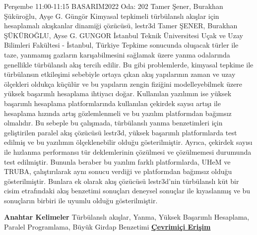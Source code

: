 
    \begin{abstract_basarim}
    {Perşembe 11:00-11:15}
    {BASARIM2022}
    {Oda: 202}
    {Tamer Şener, Burakhan Şüküroğlu, Ayşe G. Güngör}
    {Kimyasal tepkimeli türbülanslı akışlar için hesaplamalı akışkanlar dinamiği çözücüsü, lestr3d}
    {%
    Tamer ŞENER, Burakhan ŞÜKÜROĞLU, Ayse G. GUNGOR}
    {%
    }
    {%
    İstanbul Teknik Üniversitesi Uçak ve Uzay Bilimleri Fakültesi - İstanbul, Türkiye}
    Tepkime sonucunda oluşacak türler ile taze, yanmamış gazların karışabilmesini sağlamak üzere yanma odalarında genellikle türbülanslı akış tercih edilir. Bu gibi problemlerde, kimyasal tepkime ile türbülansın etkileşimi sebebiyle ortaya çıkan akış yapılarının zaman ve uzay ölçekleri oldukça küçülür ve bu yapıların zengin fiziğini modelleyebilmek üzere yüksek başarımlı hesaplama ihtiyacı doğar. Kullanılan yazılımın ise yüksek başarımlı hesaplama platformlarında kullanılan çekirdek sayısı artışı ile hesaplama hızında artış gözlemlenmeli ve bu yazılım platformdan bağımsız olmalıdır. Bu sebeple bu çalışmada, türbülanslı yanma benzetimleri için geliştirilen paralel akış çözücüsü lestr3d, yüksek başarımlı platformlarda test edilmiş ve bu yazılımın ölçeklenebilir olduğu gösterilmiştir. Ayrıca, çekirdek sayısı ile hızlanma performansı tür deklemlerinin çözülmesi ve çözülmemesi durumunda test edilmiştir. Bununla beraber bu yazılım farklı platformlarda, UHeM ve TRUBA, çalıştırılarak aynı sonucu verdiği ve platformdan bağımsız olduğu gösterilmiştir. Bunlara ek olarak akış çözücüsü lestr3d’nin türbülanslı küt bir cisim etrafındaki akış benzetimi sonuçları deneysel sonuçlar ile kıyaslanmış ve bu sonuçların birbiri ile uyumlu olduğu gösterilmiştir. 
    
            \textbf{Anahtar Kelimeler} \newline{}Türbülanslı akışlar, Yanma, Yüksek Başarımlı Hesaplama, Paralel Programlama, Büyük Girdap Benzetimi
     \newline\newline\noindent \href{https://drive.google.com/file/d/1ECkHHQJGgPhx9nL9mPXK6FDANBnI65UC/view?usp=drivesdk}{\bfseries Çevrimiçi Erişim}
    \end{abstract_basarim}
    